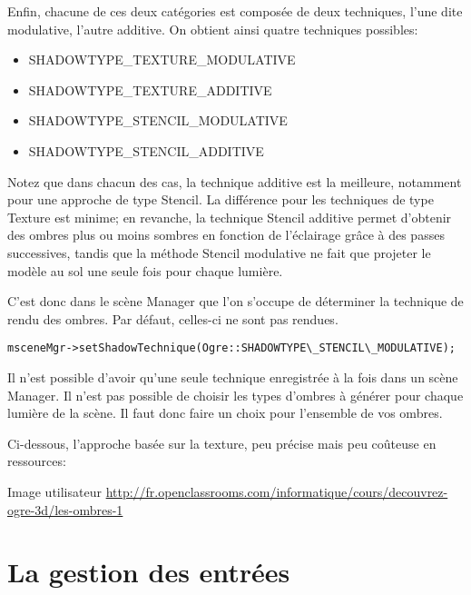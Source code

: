 \documentclass[10pt,a4paper]{report}
\begin{document}
Enfin, chacune de ces deux cat\'egories est compos\'ee de deux techniques, l'une dite modulative, l'autre additive. On obtient ainsi quatre techniques possibles:
\begin{itemize}
\item SHADOWTYPE\_TEXTURE\_MODULATIVE
\item SHADOWTYPE\_TEXTURE\_ADDITIVE
\item SHADOWTYPE\_STENCIL\_MODULATIVE
\item SHADOWTYPE\_STENCIL\_ADDITIVE
\end{itemize}


Notez que dans chacun des cas, la technique additive est la meilleure, notamment pour une approche de type Stencil. La diff\'erence pour les techniques de type Texture est minime; en revanche, la technique Stencil additive permet d'obtenir des ombres plus ou moins sombres en fonction de l'\'eclairage gr\^{a}ce \`{a} des passes successives, tandis que la m\'ethode Stencil modulative ne fait que projeter le mod\`ele au sol une seule fois pour chaque lumi\`ere.

C'est donc dans le sc\`ene Manager que l'on s'occupe de d\'eterminer la technique de rendu des ombres. Par d\'efaut, celles-ci ne sont pas rendues.
\begin{lstlisting}
msceneMgr->setShadowTechnique(Ogre::SHADOWTYPE\_STENCIL\_MODULATIVE);
\end{lstlisting}


Il n'est possible d'avoir qu'une seule technique enregistr\'ee \`{a} la fois dans un sc\`ene Manager. Il n'est pas possible de choisir les types d'ombres \`{a} g\'en\'erer pour chaque lumi\`ere de la sc\`ene. Il faut donc faire un choix pour l'ensemble de vos ombres.

Ci-dessous, l'approche bas\'ee sur la texture, peu pr\'ecise mais peu co\^uteuse en ressources:

Image utilisateur \url{http://fr.openclassrooms.com/informatique/cours/decouvrez-ogre-3d/les-ombres-1}







\part{La gestion des entr\'ees}
\end{document}
